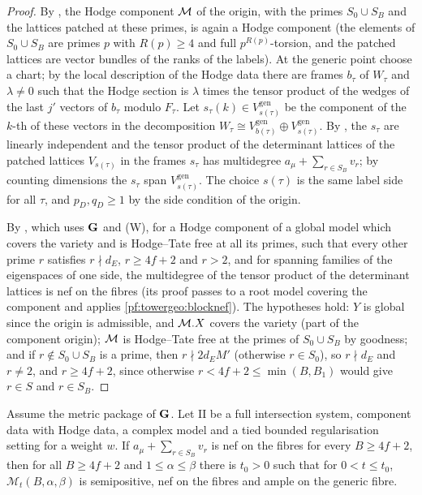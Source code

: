 \begin{proof}
By , the Hodge component $\mathcal M$ of the origin, with the
primes $S_0\cup S_B$ and the lattices patched at these primes, is again a Hodge component (the elements of
$S_0\cup S_B$ are primes $p$ with $R(p)\ge4$ and full $p^{R(p)}$-torsion, and the patched lattices are vector bundles
of the ranks of the labels). At the generic point choose a chart; by the local description of the Hodge data there
are frames $b_\tau$ of $W_\tau$ and $\lambda\ne0$ such that the Hodge section is $\lambda$ times the tensor product
of the wedges of the last $j'$ vectors of $b_\tau$ modulo $F_\tau$. Let $s_\tau(k)\in V^{\mathrm{gen}}_{s(\tau)}$ be
the component of the $k$-th of these vectors in the decomposition
$W_\tau\cong V^{\mathrm{gen}}_{b(\tau)}\oplus V^{\mathrm{gen}}_{s(\tau)}$. By
, the $s_\tau$ are linearly independent and the tensor
product of the determinant lattices of the patched lattices $V_{s(\tau)}$ in the frames $s_\tau$ has multidegree
$a_\mu+\sum_{r\in S_B}v_r$; by counting dimensions the $s_\tau$ span $V^{\mathrm{gen}}_{s(\tau)}$. The choice
$s(\tau)$ is the same label side for all $\tau$, and $p_D,q_D\ge1$ by the side condition of the origin.

By , which uses $\mathbf G$ and (W), for a Hodge component of a
global model which covers the variety and is Hodge--Tate free at all its primes, such that every other prime $r$
satisfies $r\nmid d_E$, $r\ge4f+2$ and $r>2$, and for spanning families of the eigenspaces of one side, the multidegree
of the tensor product of the determinant lattices is nef on the fibres (its proof passes to a root model covering the
component and applies \cref{pf:towergeo:blocknef}). The hypotheses hold: $Y$ is global since the origin is
admissible, and $\mathcal M.X$ covers the variety (part of the component origin); $\mathcal M$ is Hodge--Tate free
at the primes of $S_0\cup S_B$ by goodness; and if
$r\notin S_0\cup S_B$ is a prime, then $r\nmid2d_EM'$ (otherwise $r\in S_0$), so $r\nmid d_E$ and $r\ne2$, and
$r\ge4f+2$, since otherwise $r<4f+2\le\min(B,B_1)$ would give $r\in S$ and $r\in S_B$.
\end{proof}

\begin{proposition}\label{pf:towergeo:posu}
Assume the metric package of $\mathbf G$. Let $\mathrm{II}$ be a full intersection system, component data with
Hodge data, a complex model and a tied bounded regularisation setting for a weight $w$. If $a_\mu+\sum_{r\in S_B}v_r$
is nef on the fibres for every $B\ge4f+2$, then for all $B\ge4f+2$ and $1\le\alpha\le\beta$ there is $t_0>0$ such that
for $0<t\le t_0$, $\mathcal M_t(B,\alpha,\beta)$ is semipositive, nef on the fibres and ample on the generic fibre.
\end{proposition}

